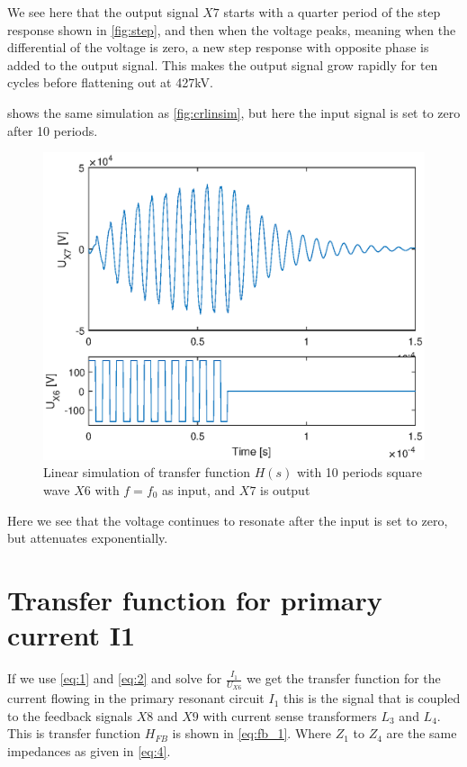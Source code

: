 We see here that the output signal $X7$ starts with a quarter period of the step response shown in \cref{fig:step}, and then when the voltage peaks, meaning when the differential of the voltage is zero, a new step response with opposite phase is added to the output signal. This makes the output signal grow rapidly for ten cycles before flattening out at 427kV.

 shows the same simulation as \cref{fig:crlinsim}, but here the input signal is set to zero after 10 periods.

\begin{figure}[H]
    \centering
    \includegraphics[width=\textwidth]{img/Linsim_10T.eps}
    \caption{Linear simulation of transfer function $H(s)$ with 10 periods square wave $X6$ with $f=f_0$ as input, and $X7$ is output}
    \label{fig:crlinsim10T}
\end{figure}

Here we see that the voltage continues to resonate after the input is set to zero, but attenuates exponentially.

\newpage
\section{Transfer function for primary current I1}
\label{sec:mod_fb}
If we use \cref{eq:1} and \cref{eq:2} and solve for $\frac{I_1}{U_{X6}}$ we get the transfer function for the current flowing in the primary resonant circuit $I_1$ this is the signal that is coupled to the feedback signals $X8$ and $X9$ with current sense transformers $L_3$ and $L_4$. This is transfer function $H_{FB}$ is shown in \cref{eq:fb_1}. Where $Z_1$ to $Z_4$ are the same impedances as given in \cref{eq:4}.

